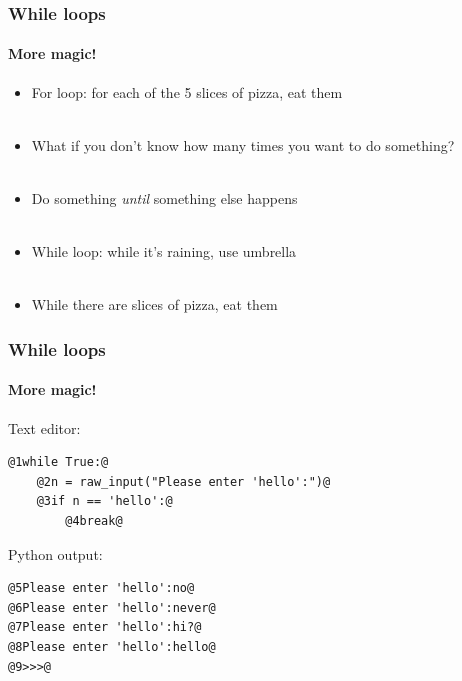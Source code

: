 \documentclass{beamer}
\begin{document}
\begin{frame}[fragile]
\frametitle{While loops}
\framesubtitle{More magic!}
\large


\begin{itemize}

\item<1->{For loop: for each of the 5 slices of pizza, eat them} \\ \

 \item<2-> What if you don't know how many times you want to do something? \\ \

\item<3->{Do something \emph{until} something else happens} \\ \



\item<4->{While loop: while it's raining, use umbrella}\\ \

\item<5-> While there are slices of pizza, eat them





\end{itemize}
\end{frame}

\begin{frame}[fragile]
\frametitle{While loops}
\framesubtitle{More magic!}

     
         Text editor:
\begin{lstlisting}[style=base]
@1while True:@
    @2n = raw_input("Please enter 'hello':")@
    @3if n == 'hello':@
        @4break@

\end{lstlisting}

\vfill

Python output:
\begin{lstlisting}[style=base]
@5Please enter 'hello':no@
@6Please enter 'hello':never@
@7Please enter 'hello':hi?@
@8Please enter 'hello':hello@
@9>>>@


\end{lstlisting}


\end{frame}
\end{document}
